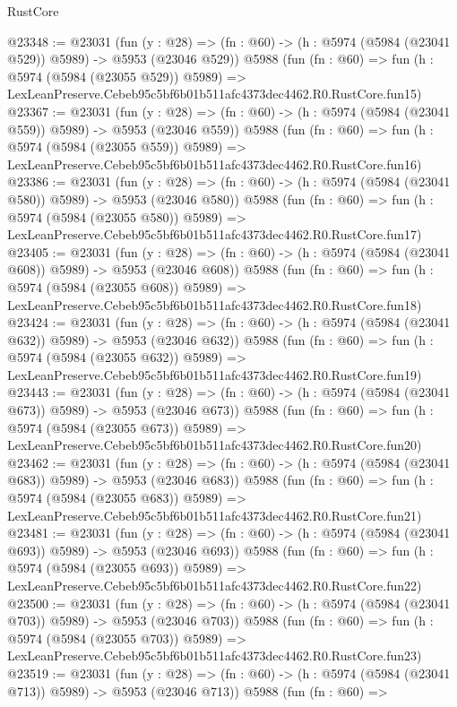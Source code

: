 \begin{lexlean}{RustCore}
\begin{coremodule}
@23348 := @23031
    (fun (y : @28) => (fn : @60) -> (h : @5974 (@5984 (@23041 @529)) @5989) -> @5953 (@23046 @529))
    @5988
    (fun (fn : @60) =>
    fun (h : @5974 (@5984 (@23055 @529)) @5989) =>
    LexLeanPreserve.Cebeb95c5bf6b01b511afc4373dec4462.R0.RustCore.fun15)
@23367 := @23031
    (fun (y : @28) => (fn : @60) -> (h : @5974 (@5984 (@23041 @559)) @5989) -> @5953 (@23046 @559))
    @5988
    (fun (fn : @60) =>
    fun (h : @5974 (@5984 (@23055 @559)) @5989) =>
    LexLeanPreserve.Cebeb95c5bf6b01b511afc4373dec4462.R0.RustCore.fun16)
@23386 := @23031
    (fun (y : @28) => (fn : @60) -> (h : @5974 (@5984 (@23041 @580)) @5989) -> @5953 (@23046 @580))
    @5988
    (fun (fn : @60) =>
    fun (h : @5974 (@5984 (@23055 @580)) @5989) =>
    LexLeanPreserve.Cebeb95c5bf6b01b511afc4373dec4462.R0.RustCore.fun17)
@23405 := @23031
    (fun (y : @28) => (fn : @60) -> (h : @5974 (@5984 (@23041 @608)) @5989) -> @5953 (@23046 @608))
    @5988
    (fun (fn : @60) =>
    fun (h : @5974 (@5984 (@23055 @608)) @5989) =>
    LexLeanPreserve.Cebeb95c5bf6b01b511afc4373dec4462.R0.RustCore.fun18)
@23424 := @23031
    (fun (y : @28) => (fn : @60) -> (h : @5974 (@5984 (@23041 @632)) @5989) -> @5953 (@23046 @632))
    @5988
    (fun (fn : @60) =>
    fun (h : @5974 (@5984 (@23055 @632)) @5989) =>
    LexLeanPreserve.Cebeb95c5bf6b01b511afc4373dec4462.R0.RustCore.fun19)
@23443 := @23031
    (fun (y : @28) => (fn : @60) -> (h : @5974 (@5984 (@23041 @673)) @5989) -> @5953 (@23046 @673))
    @5988
    (fun (fn : @60) =>
    fun (h : @5974 (@5984 (@23055 @673)) @5989) =>
    LexLeanPreserve.Cebeb95c5bf6b01b511afc4373dec4462.R0.RustCore.fun20)
@23462 := @23031
    (fun (y : @28) => (fn : @60) -> (h : @5974 (@5984 (@23041 @683)) @5989) -> @5953 (@23046 @683))
    @5988
    (fun (fn : @60) =>
    fun (h : @5974 (@5984 (@23055 @683)) @5989) =>
    LexLeanPreserve.Cebeb95c5bf6b01b511afc4373dec4462.R0.RustCore.fun21)
@23481 := @23031
    (fun (y : @28) => (fn : @60) -> (h : @5974 (@5984 (@23041 @693)) @5989) -> @5953 (@23046 @693))
    @5988
    (fun (fn : @60) =>
    fun (h : @5974 (@5984 (@23055 @693)) @5989) =>
    LexLeanPreserve.Cebeb95c5bf6b01b511afc4373dec4462.R0.RustCore.fun22)
@23500 := @23031
    (fun (y : @28) => (fn : @60) -> (h : @5974 (@5984 (@23041 @703)) @5989) -> @5953 (@23046 @703))
    @5988
    (fun (fn : @60) =>
    fun (h : @5974 (@5984 (@23055 @703)) @5989) =>
    LexLeanPreserve.Cebeb95c5bf6b01b511afc4373dec4462.R0.RustCore.fun23)
@23519 := @23031
    (fun (y : @28) => (fn : @60) -> (h : @5974 (@5984 (@23041 @713)) @5989) -> @5953 (@23046 @713))
    @5988
    (fun (fn : @60) =>

\end{coremodule}
\end{lexlean}
